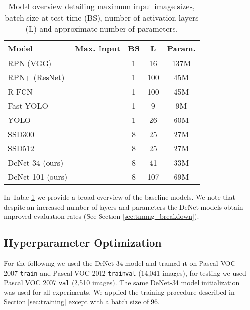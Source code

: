\documentclass[10pt,twocolumn]{article}
\begin{document}
\begin{table}[htb]
\begin{center}
\begin{tabular}{ l |c| c| c|c }
Model & Max. Input & BS & L & Param. \\
\hline
\rowcolor[gray]{.85} RPN (VGG)\cite{faster-rcnn} &  & 1 & 16 & 137M \\
\rowcolor[gray]{.85} RPN+ (ResNet)\cite{resnet} &  & 1 & 100 & 45M \\
\rowcolor[gray]{.85} R-FCN \cite{r-fcn} &  & 1 & 100 & 45M \\
Fast YOLO\cite{yolo} &  & 1 & 9 & 9M  \\
YOLO\cite{yolo} &  & 1 & 26 & 60M \\
SSD300\cite{ssd} &  & 8 & 25 & 27M  \\
SSD512\cite{ssd} &  & 8 & 25 & 27M \\
\hline
DeNet-34 (ours) &  & 8 & 41 & 33M \\
DeNet-101 (ours) &  & 8 & 107  & 69M \\
\end{tabular}
\end{center}
\caption{Model overview detailing maximum input image sizes, batch size at test time (BS), number of activation layers (L) and approximate number of parameters. }
\label{table:model_overview}
\end{table}

In Table \ref{table:model_overview} we provide a broad overview of the baseline models. We note that despite an increased number of layers and parameters the DeNet models obtain improved evaluation rates (See Section \ref{sec:timing_breakdown}). 

\subsection{Hyperparameter Optimization}

For the following we used the DeNet-34 model and trained it on Pascal VOC 2007 \texttt{train} and Pascal VOC 2012 \texttt{trainval} (14,041 images), for testing we used Pascal VOC 2007 \texttt{val} (2,510 images). The same DeNet-34 model initialization was used for all experiments. We applied the training procedure described in Section \ref{sec:training} except with a batch size of 96. 

\begin{table}[tb] 
\setlength{\extrarowheight}{1pt}
\begin{center}
\end{center}
\caption{Optimizing cost hyperparameters , see Equation \ref{eq:cost}. MAP is provided for Pascal VOC 2007 \texttt{val} dataset.}
\label{table:optimize_lambda}
\end{table}
\end{document}
